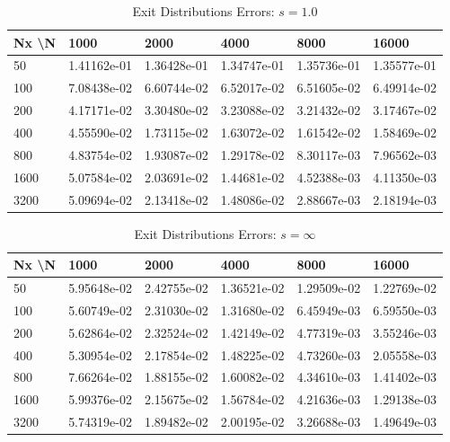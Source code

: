 \begin{table}[h]
\centering
\caption{Exit Distributions Errors: $s = 1.0$}
\label{tab:bigtab1}
\begin{tabular}{l|lllll} 
Nx \textbackslash N &     1000 &     2000 &     4000 &     8000 &    16000 \\ 
\hline 
50 & 1.41162e-01& 1.36428e-01& 1.34747e-01& 1.35736e-01& 1.35577e-01   \\ 
100 & 7.08438e-02& 6.60744e-02& 6.52017e-02& 6.51605e-02& 6.49914e-02   \\ 
200 & 4.17171e-02& 3.30480e-02& 3.23088e-02& 3.21432e-02& 3.17467e-02   \\ 
400 & 4.55590e-02& 1.73115e-02& 1.63072e-02& 1.61542e-02& 1.58469e-02   \\ 
800 & 4.83754e-02& 1.93087e-02& 1.29178e-02& 8.30117e-03& 7.96562e-03   \\ 
1600 & 5.07584e-02& 2.03691e-02& 1.44681e-02& 4.52388e-03& 4.11350e-03   \\ 
3200 & 5.09694e-02& 2.13418e-02& 1.48086e-02& 2.88667e-03& 2.18194e-03   \\ 
\hline 
\end{tabular} 
\end{table}

\begin{table}[h]
\centering
\caption{Exit Distributions Errors: $s = \infty$}
\label{tab:bigtabinf}
\begin{tabular}{l|lllll} 
Nx \textbackslash N &     1000 &     2000 &     4000 &     8000 &    16000 \\ 
\hline 
50 & 5.95648e-02& 2.42755e-02& 1.36521e-02& 1.29509e-02& 1.22769e-02   \\ 
100 & 5.60749e-02& 2.31030e-02& 1.31680e-02& 6.45949e-03& 6.59550e-03   \\ 
200 & 5.62864e-02& 2.32524e-02& 1.42149e-02& 4.77319e-03& 3.55246e-03   \\ 
400 & 5.30954e-02& 2.17854e-02& 1.48225e-02& 4.73260e-03& 2.05558e-03   \\ 
800 & 7.66264e-02& 1.88155e-02& 1.60082e-02& 4.34610e-03& 1.41402e-03   \\ 
1600 & 5.99376e-02& 2.15675e-02& 1.56784e-02& 4.21636e-03& 1.29138e-03   \\ 
3200 & 5.74319e-02& 1.89482e-02& 2.00195e-02& 3.26688e-03& 1.49649e-03   \\ 
\hline 
\end{tabular} 
\end{table}
